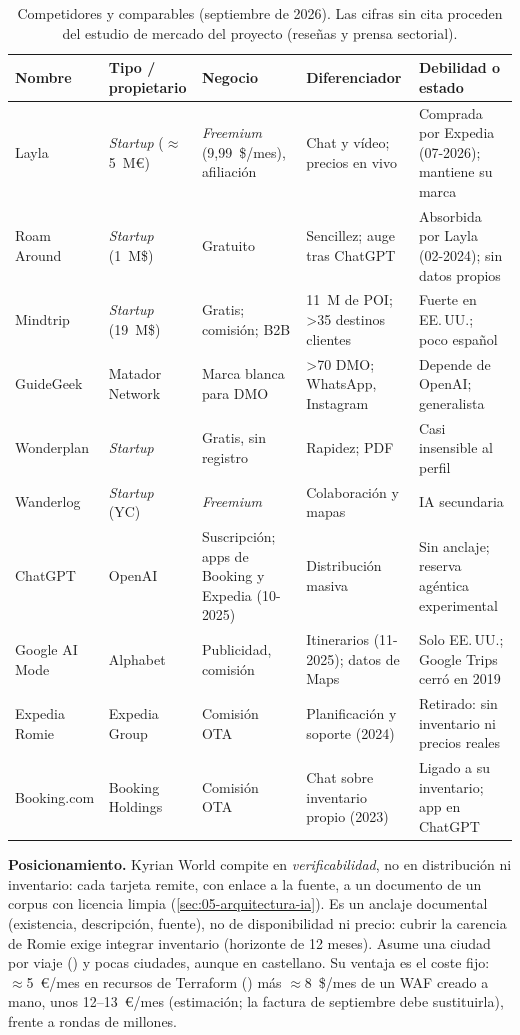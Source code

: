 \begin{table}[tb]\centering\footnotesize
\begin{tabularx}{\textwidth}{@{}p{1.9cm}p{2.4cm}YYY@{}}\toprule
Nombre & Tipo / propietario & Negocio & Diferenciador & Debilidad o estado \\\midrule
Layla & \emph{Startup} ($\approx$5~M€) & \emph{Freemium} (9,99~\$/mes), afiliación \cite{mk:laylapricing} & Chat y vídeo; precios en vivo & Comprada por Expedia (07-2026); mantiene su marca \cite{mk:laylaexpedia} \\
Roam Around & \emph{Startup} (1~M\$) & Gratuito & Sencillez; auge tras ChatGPT & Absorbida por Layla (02-2024); sin datos propios \\
Mindtrip & \emph{Startup} (19~M\$) & Gratis; comisión; B2B & 11~M de POI; >35 destinos clientes \cite{mk:mindtrip} & Fuerte en EE.\,UU.; poco español \\
GuideGeek & Matador Network & Marca blanca para DMO & >70 DMO; WhatsApp, Instagram \cite{mk:guidegeek} & Depende de OpenAI; generalista \\
Wonderplan & \emph{Startup} & Gratis, sin registro & Rapidez; PDF & Casi insensible al perfil \\
Wanderlog & \emph{Startup} (YC) & \emph{Freemium} & Colaboración y mapas & IA secundaria \\
ChatGPT & OpenAI & Suscripción; apps de Booking y Expedia (10-2025) \cite{mk:chatgptapps} & Distribución masiva & Sin anclaje; reserva agéntica experimental \\
Google AI Mode & Alphabet & Publicidad, comisión & Itinerarios (11-2025); datos de Maps \cite{mk:googleaimode} & Solo EE.\,UU.; Google Trips cerró en 2019 \\
Expedia Romie & Expedia Group & Comisión OTA & Planificación y soporte (2024) & Retirado: sin inventario ni precios reales \cite{mk:romie} \\
Booking.com & Booking Holdings & Comisión OTA & Chat sobre inventario propio (2023) & Ligado a su inventario; app en ChatGPT \\\bottomrule
\end{tabularx}
\caption{Competidores y comparables (septiembre de 2026). Las cifras sin cita proceden del
estudio de mercado del proyecto (reseñas y prensa sectorial).}
\label{tab:03-competidores}
\end{table}

\textbf{Posicionamiento.} Kyrian World compite en \emph{verificabilidad}, no en distribución ni
inventario: cada tarjeta remite, con enlace a la fuente, a un documento de un corpus con licencia
limpia (\cref{sec:05-arquitectura-ia}). Es un anclaje documental (existencia, descripción, fuente),
no de disponibilidad ni precio: cubrir la carencia de Romie exige integrar inventario (horizonte
de 12 meses). Asume una ciudad por viaje () y pocas ciudades, aunque en castellano. Su
ventaja es el coste fijo: $\approx$5~€/mes en recursos de Terraform () más
$\approx$8~\$/mes de un WAF creado a mano, unos 12--13~€/mes (estimación; la factura de septiembre
debe sustituirla), frente a rondas de millones.

